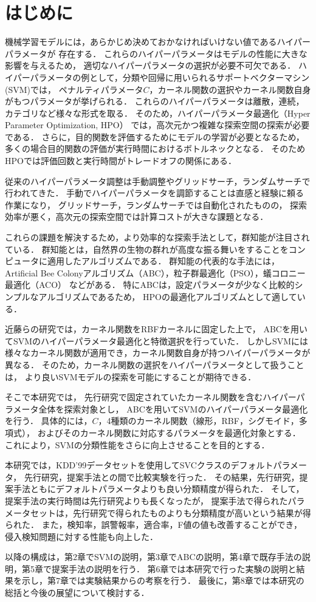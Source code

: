 \section{はじめに}
機械学習モデルには，あらかじめ決めておかなければいけない値であるハイパーパラメータが
存在する．
これらのハイパーパラメータはモデルの性能に大きな影響を与えるため，
適切なハイパーパラメータの選択が必要不可欠である\cite{essential}．
ハイパーパラメータの例として，分類や回帰に用いられるサポートベクターマシン(SVM)では，
ペナルティパラメータ$C$，カーネル関数の選択やカーネル関数自身がもつパラメータが挙げられる．
これらのハイパーパラメータは離散，連続，カテゴリなど様々な形式を取る．
そのため，ハイパーパラメータ最適化（Hyper Parameter Optimization, HPO）
では，高次元かつ複雑な探索空間の探索が必要である．
さらに，目的関数を評価するためにモデルの学習が必要となるため，
多くの場合目的関数の評価が実行時間におけるボトルネックとなる．
そのためHPOでは評価回数と実行時間がトレードオフの関係にある\cite{trade}．

従来のハイパーパラメータ調整は手動調整やグリッドサーチ，ランダムサーチで行われてきた．
手動でハイパーパラメータを調節することは直感と経験に頼る作業になり，
グリッドサーチ，ランダムサーチでは自動化されたものの，
探索効率が悪く，高次元の探索空間では計算コストが大きな課題となる\cite{trade}．

これらの課題を解決するため，より効率的な探索手法として，群知能が注目されている．
群知能とは，自然界の生物の群れが高度な振る舞いをすることをコンピュータに適用したアルゴリズムである\cite{population}．
群知能の代表的な手法には，Artificial Bee Colonyアルゴリズム（ABC），粒子群最適化（PSO），蟻コロニー最適化（ACO）
などがある．
特にABCは，設定パラメータが少なく比較的シンプルなアルゴリズムであるため，
HPOの最適化アルゴリズムとして適している．

近藤らの研究\cite{origin}では，カーネル関数をRBFカーネルに固定した上で，
ABCを用いてSVMのハイパーパラメータ最適化と特徴選択を行っていた．
しかしSVMには様々なカーネル関数が適用でき，カーネル関数自身が持つハイパーパラメータが異なる．
そのため，カーネル関数の選択をハイパーパラメータとして扱うことは，
より良いSVMモデルの探索を可能にすることが期待できる．

そこで本研究では，
先行研究で固定されていたカーネル関数を含むハイパーパラメータ全体を探索対象とし，
ABCを用いてSVMのハイパーパラメータ最適化を行う．
具体的には，$C$，4種類のカーネル関数（線形，RBF，シグモイド，多項式），
およびそのカーネル関数に対応するパラメータを最適化対象とする．
これにより，SVMの分類性能をさらに向上させることを目的とする．

本研究では，KDD'99データセットを使用してSVCクラスのデフォルトパラメータ，
先行研究，提案手法との間で比較実験を行った．
その結果，先行研究，提案手法ともにデフォルトパラメータよりも良い分類精度が得られた．
そして，提案手法の実行時間は先行研究よりも長くなったが，
提案手法で得られたパラメータセットは，先行研究で得られたものよりも分類精度が高いという結果が得られた．
また，検知率，誤警報率，適合率，F値の値も改善することができ，
侵入検知問題に対する性能も向上した．

以降の構成は，第2章でSVMの説明，第3章でABCの説明，第4章で既存手法の説明，第5章で提案手法の説明を行う．
第6章では本研究で行った実験の説明と結果を示し，第7章では実験結果からの考察を行う．
最後に，第8章では本研究の総括と今後の展望について検討する．